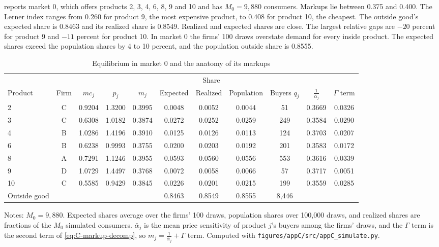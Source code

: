  reports market 0, which offers products 2, 3, 4, 6, 8, 9 and 10 and has $M_0 = 9{,}880$ consumers.
Markups lie between 0.375 and 0.400. The Lerner index ranges from 0.260 for product 9, the most expensive product, to
0.408 for product 10, the cheapest. The outside good's expected share is 0.8463 and its realized share is 0.8549.
Realized and expected shares are close. The largest relative gaps are $-20$ percent for product 9 and $-11$ percent
for product 10. In market 0 the firms' 100 draws overstate demand for every inside product. The expected shares
exceed the population shares by 4 to 10 percent, and the population outside share is 0.8555.

\begin{table}[htbp]
\centering
\caption{Equilibrium in market 0 and the anatomy of its markups}
\label{tab:C-mkt0}
\footnotesize
\setlength{\tabcolsep}{4.5pt}
\begin{tabular}{@{}lcccccccccc@{}}
\toprule
 & & & & & \multicolumn{3}{c}{Share} & & & \\
\cmidrule(lr){6-8}
Product & Firm & $mc_j$ & $p_j$ & $m_j$ & Expected & Realized & Population & Buyers $q_j$ & $\frac{1}{\bar\alpha_j}$ & $\Gamma$ term \\
\midrule
2 & C & 0.9204 & 1.3200 & 0.3995 & 0.0048 & 0.0052 & 0.0044 & 51 & 0.3669 & 0.0326 \\
3 & C & 0.6308 & 1.0182 & 0.3874 & 0.0272 & 0.0252 & 0.0259 & 249 & 0.3584 & 0.0290 \\
4 & B & 1.0286 & 1.4196 & 0.3910 & 0.0125 & 0.0126 & 0.0113 & 124 & 0.3703 & 0.0207 \\
6 & B & 0.6238 & 0.9993 & 0.3755 & 0.0200 & 0.0203 & 0.0192 & 201 & 0.3583 & 0.0172 \\
8 & A & 0.7291 & 1.1246 & 0.3955 & 0.0593 & 0.0560 & 0.0556 & 553 & 0.3616 & 0.0339 \\
9 & D & 1.0729 & 1.4497 & 0.3768 & 0.0072 & 0.0058 & 0.0066 & 57 & 0.3717 & 0.0051 \\
10 & C & 0.5585 & 0.9429 & 0.3845 & 0.0226 & 0.0201 & 0.0215 & 199 & 0.3559 & 0.0285 \\
\midrule
Outside good & & & & & 0.8463 & 0.8549 & 0.8555 & 8,446 & & \\
\bottomrule
\end{tabular}

\vspace{3pt}
\begin{minipage}{0.97\textwidth}
\footnotesize Notes: $M_0 = 9{,}880$. Expected shares average over the firms' 100 draws, population shares over
100,000 draws, and realized shares are fractions of the $M_0$ simulated consumers. $\bar\alpha_j$ is the mean price
sensitivity of product $j$'s buyers among the firms' draws, and the $\Gamma$ term is the second term of
\eqref{eq:C-markup-decomp}, so $m_j = \frac{1}{\bar\alpha_j} + \Gamma$ term. Computed with
\texttt{figures/appC/src/appC\_simulate.py}.
\end{minipage}
\end{table}

